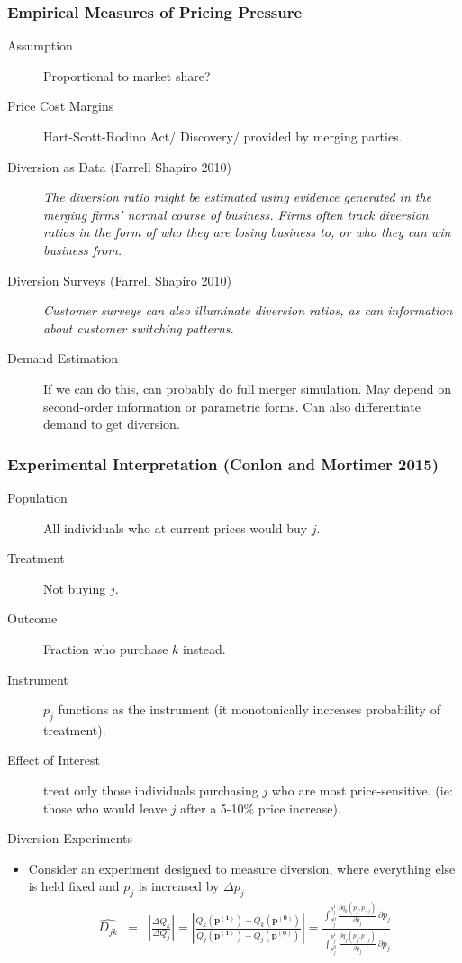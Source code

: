 \documentclass[xcolor=pdftex,dvipsnames,table,mathserif]{beamer}
\begin{document}
\begin{frame}
\frametitle{Empirical Measures of Pricing Pressure}
\begin{description}
\item[Assumption] Proportional to market share?
\item[Price Cost Margins] Hart-Scott-Rodino Act/ Discovery/ provided by merging parties.
\item[Diversion as Data (Farrell Shapiro 2010)] \textit{The diversion ratio might be estimated using evidence generated in the merging firms' normal course of business. Firms often track diversion ratios in the form of who they are losing business to, or who they can win business from.}
\item[Diversion Surveys (Farrell Shapiro 2010)] \textit{Customer surveys can also illuminate diversion ratios, as can information about customer switching patterns.}
\item[Demand Estimation] If we can do this, can probably do full merger simulation. May depend on second-order information or parametric forms. Can also differentiate demand to get diversion.
\end{description}
\end{frame}

\begin{frame}
\frametitle{Experimental Interpretation (Conlon and Mortimer 2015)}
\begin{description}
\item[Population] All individuals who at current prices would buy $j$.
\item[Treatment] Not buying $j$.
\item[Outcome] Fraction who purchase $k$ instead.
\item[Instrument] $p_j$ functions as the instrument (it monotonically increases probability of treatment).
\item[Effect of Interest] treat only those individuals purchasing $j$ who are most price-sensitive. (ie: those who would leave  $j$ after a 5-10\% price increase).
\end{description}
\end{frame}

\begin{frame}{Diversion Experiments}
\begin{itemize}
\item Consider an experiment designed to measure diversion, where everything else is held fixed and $p_j$ is increased by $\Delta p_j$ 
\begin{eqnarray*}
\widehat{D_{jk}} &=& \left| \frac{\Delta Q_{k}}{\Delta Q_j} \right| =  \left| \frac{Q_{k}(\mathbf{p^{(1)}}) - Q_{k}(\mathbf{p^{(0)}})}{Q_{j}(\mathbf{p^{(1)}}) - Q_{j}(\mathbf{p^{(0)}})}   \right| = \frac{\int_{p_j^{0}}^{p_j^1}  \frac{\partial q_k(p_j,p_{-j})}{\partial p_j}\,\partial p_j }{\int_{p_j^{0}}^{p_j^1}   \frac{\partial q_j(p_j,p_{-j})}{\partial p_j} \, \partial p_j}
\end{eqnarray*}
\end{itemize}
\end{frame}
\end{document}

